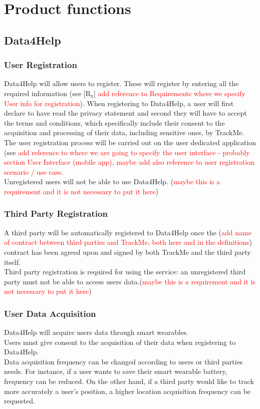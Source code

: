 \documentclass{report}
\newcommand\todo[1]{\textcolor{red}{#1}}
\newcommand{\subs}[1]{\ensuremath{_{\textrm{#1}}}}
\begin{document}
		\section{Product functions}
			\subsection{Data4Help}
			
			\subsubsection{User Registration}
			Data4Help will allow users to register. These will register by entering all the required information (see [R\subs{x}] \todo{add reference to Requirements where we specify User info for registration}). When registering to Data4Help, a user will first declare to have read the privacy statement and second they will have to accept the terms and conditions, which specifically include their consent to the acquisition and processing of their data, including sensitive ones, by TrackMe.\\
			The user registration process will be carried out on the user dedicated application (see \todo{add reference to where we are going to specify the user interface - probably section User Interface (mobile app), maybe add also reference to user registration scenario / use case}.\\
			Unregistered users will not be able to use Data4Help. (\todo{maybe this is a requirement and it is not necessary to put it here})
			
			\subsubsection{Third Party Registration}
			A third party will be automatically registered to Data4Help once the (\todo{add name of contract between third parties and TrackMe, both here and in the definitions}) contract has been agreed upon and signed by both TrackMe and the third party itself.\\
			Third party registration is required for using the service: an unregistered third party must not be able to access users data.(\todo{maybe this is a requirement and it is not necessary to put it here})
			
			\subsubsection{User Data Acquisition}
			Data4Help will acquire users data through smart wearables. \\
			Users must give consent to the acquisition of their data when registering to Data4Help.\\
			Data acquisition frequency can be changed according to users or third parties needs. For instance, if a user wants to save their smart wearable battery, frequency can be reduced. On the other hand, if a third party would like to track more accurately a user's position, a higher location acquisition frequency can be requested.	
\end{document}
